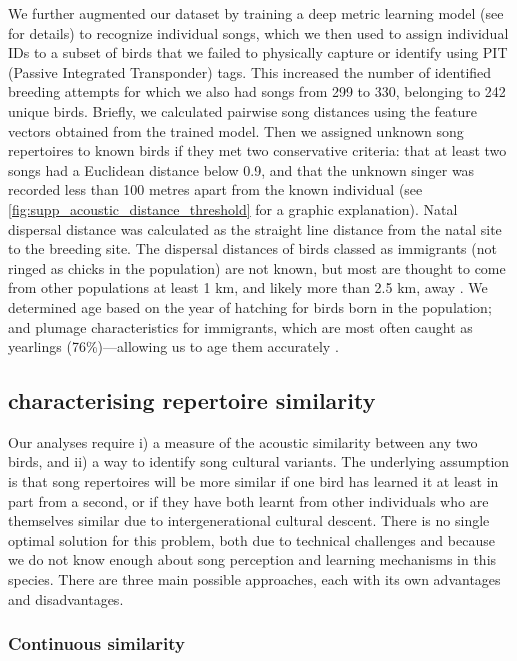 \documentclass[9pt, twocolumn, twoside]{gsajnl}
\begin{document}
We further augmented our dataset by training a deep metric learning model (see \parencite{merinorecalde2023a} for details) to recognize individual songs, which we then used to assign individual IDs to a subset of birds that we failed to physically capture or identify using PIT (Passive Integrated Transponder) tags. This increased the number of identified breeding attempts for which we also had songs from 299 to 330, belonging to 242 unique birds. Briefly, we calculated pairwise song distances using the feature vectors obtained from the trained model. Then we assigned unknown song repertoires to known birds if they met two conservative criteria: that at least two songs had a Euclidean distance below 0.9, and that the unknown singer was recorded less than 100 metres apart from the known individual (see \autoref{fig:supp_acoustic_distance_threshold} for a graphic explanation).
Natal dispersal distance was calculated as the straight line distance from the natal site to the breeding site. The dispersal distances of birds classed as immigrants (not ringed as chicks in the population) are not known, but most are thought to come from other populations at least 1 km, and likely more than 2.5 km, away \parencite{verhulst1997, quinn2011}. We determined age based on the year of hatching for birds born in the population; and plumage characteristics for immigrants, which are most often caught as yearlings (76\%)---allowing us to age them accurately \parencite{woodman2023}.

\subsection{characterising repertoire similarity}

Our analyses require i) a measure of the acoustic similarity between any two birds, and ii) a way to identify song cultural variants.  The underlying assumption is that song repertoires will be more similar if one bird has learned it at least in part from a second, or if they have both learnt from other individuals who are themselves similar due to intergenerational cultural descent. There is no single optimal solution for this problem, both due to technical challenges and because we do not know enough about song perception and learning mechanisms in this species. There are three main possible approaches, each with its own advantages and disadvantages.

\subsubsection{Continuous similarity}
\label{song-similarity}
\end{document}

